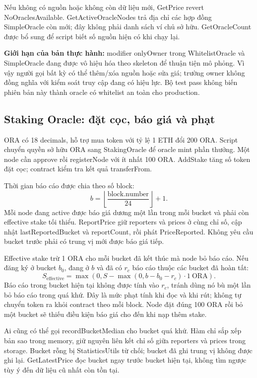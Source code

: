 Nếu không có nguồn hoặc không còn dữ liệu mới, GetPrice revert NoOraclesAvailable. GetActiveOracleNodes trả địa chỉ các hợp đồng SimpleOracle còn mới; đây không phải danh sách ví chủ sở hữu. GetOracleCount được bổ sung để script biết số nguồn hiện có khi chạy lại.

\textbf{Giới hạn của bản thực hành:} modifier onlyOwner trong WhitelistOracle và SimpleOracle đang được vô hiệu hóa theo skeleton để thuận tiện mô phỏng. Vì vậy người gọi bất kỳ có thể thêm/xóa nguồn hoặc sửa giá; trường owner không đồng nghĩa với kiểm soát truy cập đang có hiệu lực. Bộ test pass không biến phiên bản này thành oracle có whitelist an toàn cho production.

\subsection{Staking Oracle: đặt cọc, báo giá và phạt}

ORA có 18 decimals, hỗ trợ mua token với tỷ lệ 1 ETH đổi 200 ORA. Script chuyển quyền sở hữu ORA sang StakingOracle để oracle mint phần thưởng. Một node cần approve rồi registerNode với ít nhất 100 ORA. AddStake tăng số token đặt cọc; contract kiểm tra kết quả transferFrom.

Thời gian báo cáo được chia theo số block:
\[
    b=\left\lfloor\frac{\mathrm{block.number}}{24}\right\rfloor+1.
\]
Mỗi node đang active được báo giá dương một lần trong mỗi bucket và phải còn effective stake tối thiểu. ReportPrice giữ reporters và prices ở cùng chỉ số, cập nhật lastReportedBucket và reportCount, rồi phát PriceReported. Không yêu cầu bucket trước phải có trung vị mới được báo giá tiếp.

Effective stake trừ 1 ORA cho mỗi bucket đã kết thúc mà node bỏ báo cáo. Nếu đăng ký ở bucket $b_0$, đang ở $b$ và đã có $r_c$ báo cáo thuộc các bucket đã hoàn tất:
\[
    S_{\mathrm{effective}}=\max\left(0,
    S-\max(0,b-b_0-r_c)\cdot 1\ \mathrm{ORA}\right).
\]
Báo cáo trong bucket hiện tại không được tính vào $r_c$, tránh dùng nó bù một lần bỏ báo cáo trong quá khứ. Đây là mức phạt tính khi đọc và khi rút; không tự chuyển token ra khỏi contract theo mỗi block. Node đặt đúng 100 ORA rồi bỏ một bucket sẽ thiếu điều kiện báo giá cho đến khi nạp thêm stake.

Ai cũng có thể gọi recordBucketMedian cho bucket quá khứ. Hàm chỉ sắp xếp bản sao trong memory, giữ nguyên liên kết chỉ số giữa reporters và prices trong storage. Bucket rỗng bị StatisticsUtils từ chối; bucket đã ghi trung vị không được ghi lại. GetLatestPrice đọc bucket ngay trước bucket hiện tại, không tìm ngược tùy ý đến dữ liệu cũ nhất còn tồn tại.

